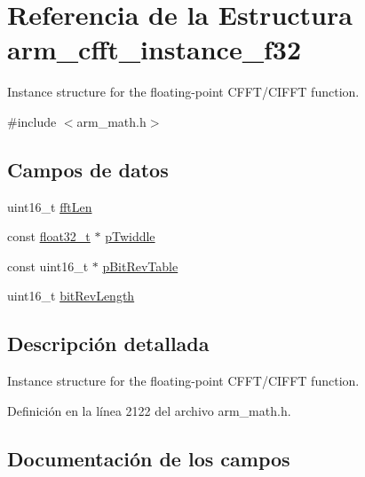 \hypertarget{structarm__cfft__instance__f32}{}\section{Referencia de la Estructura arm\+\_\+cfft\+\_\+instance\+\_\+f32}
\label{structarm__cfft__instance__f32}


Instance structure for the floating-\/point C\+F\+F\+T/\+C\+I\+F\+FT function.  




{\ttfamily \#include $<$arm\+\_\+math.\+h$>$}

\subsection*{Campos de datos}
\begin{DoxyCompactItemize}
\item 
uint16\+\_\+t \hyperlink{structarm__cfft__instance__f32_ab8db3bbe7c61e6bb8ca2a55e3446e11a}{fft\+Len}
\item 
const \hyperlink{arm__math_8h_a4611b605e45ab401f02cab15c5e38715}{float32\+\_\+t} $\ast$ \hyperlink{structarm__cfft__instance__f32_a8292d9775f5c5472f59915649fe3b378}{p\+Twiddle}
\item 
const uint16\+\_\+t $\ast$ \hyperlink{structarm__cfft__instance__f32_a3b229432d381b0a511a9cdbe3aa74e78}{p\+Bit\+Rev\+Table}
\item 
uint16\+\_\+t \hyperlink{structarm__cfft__instance__f32_a65e1b3e327b8fab9404287ed8f347cc8}{bit\+Rev\+Length}
\end{DoxyCompactItemize}


\subsection{Descripción detallada}
Instance structure for the floating-\/point C\+F\+F\+T/\+C\+I\+F\+FT function. 

Definición en la línea 2122 del archivo arm\+\_\+math.\+h.



\subsection{Documentación de los campos}
